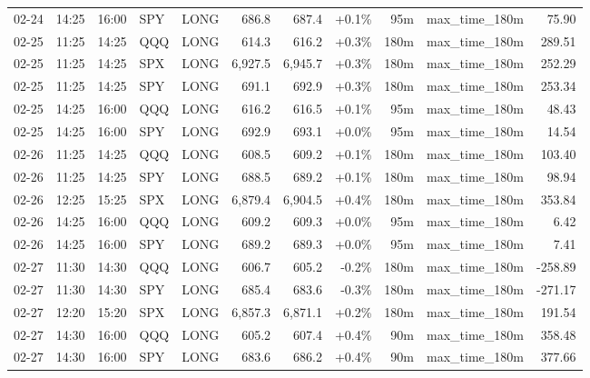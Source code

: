 \documentclass[11pt,a4paper,twoside]{article}
\begin{document}
\begin{center}
\begin{longtable}{>{\color{txtmain}}l l l l l r r r r >{\color{txtmain}}l r}
02-24 & 14:25 & 16:00 & SPY & LONG & 686.8 & 687.4 & \textcolor{wingreen}{+0.1\%} & 95m & max\_time\_180m & \textcolor{wingreen}{75.90} \\
02-25 & 11:25 & 14:25 & QQQ & LONG & 614.3 & 616.2 & \textcolor{wingreen}{+0.3\%} & 180m & max\_time\_180m & \textcolor{wingreen}{289.51} \\
02-25 & 11:25 & 14:25 & SPX & LONG & 6,927.5 & 6,945.7 & \textcolor{wingreen}{+0.3\%} & 180m & max\_time\_180m & \textcolor{wingreen}{252.29} \\
02-25 & 11:25 & 14:25 & SPY & LONG & 691.1 & 692.9 & \textcolor{wingreen}{+0.3\%} & 180m & max\_time\_180m & \textcolor{wingreen}{253.34} \\
02-25 & 14:25 & 16:00 & QQQ & LONG & 616.2 & 616.5 & \textcolor{wingreen}{+0.1\%} & 95m & max\_time\_180m & \textcolor{wingreen}{48.43} \\
02-25 & 14:25 & 16:00 & SPY & LONG & 692.9 & 693.1 & \textcolor{wingreen}{+0.0\%} & 95m & max\_time\_180m & \textcolor{wingreen}{14.54} \\
02-26 & 11:25 & 14:25 & QQQ & LONG & 608.5 & 609.2 & \textcolor{wingreen}{+0.1\%} & 180m & max\_time\_180m & \textcolor{wingreen}{103.40} \\
02-26 & 11:25 & 14:25 & SPY & LONG & 688.5 & 689.2 & \textcolor{wingreen}{+0.1\%} & 180m & max\_time\_180m & \textcolor{wingreen}{98.94} \\
02-26 & 12:25 & 15:25 & SPX & LONG & 6,879.4 & 6,904.5 & \textcolor{wingreen}{+0.4\%} & 180m & max\_time\_180m & \textcolor{wingreen}{353.84} \\
02-26 & 14:25 & 16:00 & QQQ & LONG & 609.2 & 609.3 & \textcolor{wingreen}{+0.0\%} & 95m & max\_time\_180m & \textcolor{wingreen}{6.42} \\
02-26 & 14:25 & 16:00 & SPY & LONG & 689.2 & 689.3 & \textcolor{wingreen}{+0.0\%} & 95m & max\_time\_180m & \textcolor{wingreen}{7.41} \\
02-27 & 11:30 & 14:30 & QQQ & LONG & 606.7 & 605.2 & \textcolor{lossred}{-0.2\%} & 180m & max\_time\_180m & \textcolor{lossred}{-258.89} \\
02-27 & 11:30 & 14:30 & SPY & LONG & 685.4 & 683.6 & \textcolor{lossred}{-0.3\%} & 180m & max\_time\_180m & \textcolor{lossred}{-271.17} \\
02-27 & 12:20 & 15:20 & SPX & LONG & 6,857.3 & 6,871.1 & \textcolor{wingreen}{+0.2\%} & 180m & max\_time\_180m & \textcolor{wingreen}{191.54} \\
02-27 & 14:30 & 16:00 & QQQ & LONG & 605.2 & 607.4 & \textcolor{wingreen}{+0.4\%} & 90m & max\_time\_180m & \textcolor{wingreen}{358.48} \\
02-27 & 14:30 & 16:00 & SPY & LONG & 683.6 & 686.2 & \textcolor{wingreen}{+0.4\%} & 90m & max\_time\_180m & \textcolor{wingreen}{377.66} \\
\end{longtable}
\end{center}
\clearpage
\end{document}
